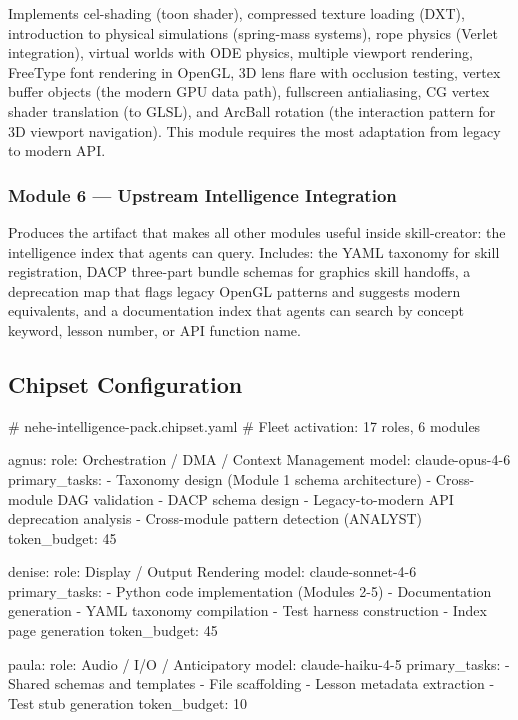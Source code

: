 \documentclass[11pt,letterpaper]{article}
\begin{document}
Implements cel-shading (toon shader), compressed texture loading (DXT), introduction to physical simulations (spring-mass systems), rope physics (Verlet integration), virtual worlds with ODE physics, multiple viewport rendering, FreeType font rendering in OpenGL, 3D lens flare with occlusion testing, vertex buffer objects (the modern GPU data path), fullscreen antialiasing, CG vertex shader translation (to GLSL), and ArcBall rotation (the interaction pattern for 3D viewport navigation). This module requires the most adaptation from legacy to modern API.

\subsubsection{Module 6 --- Upstream Intelligence Integration}

Produces the artifact that makes all other modules useful inside skill-creator: the intelligence index that agents can query. Includes: the YAML taxonomy for skill registration, DACP three-part bundle schemas for graphics skill handoffs, a deprecation map that flags legacy OpenGL patterns and suggests modern equivalents, and a documentation index that agents can search by concept keyword, lesson number, or API function name.

\subsection{Chipset Configuration}

\begin{asciibox}
# nehe-intelligence-pack.chipset.yaml
# Fleet activation: 17 roles, 6 modules

agnus:
  role: Orchestration / DMA / Context Management
  model: claude-opus-4-6
  primary_tasks:
    - Taxonomy design (Module 1 schema architecture)
    - Cross-module DAG validation
    - DACP schema design
    - Legacy-to-modern API deprecation analysis
    - Cross-module pattern detection (ANALYST)
  token_budget: 45%

denise:
  role: Display / Output Rendering
  model: claude-sonnet-4-6
  primary_tasks:
    - Python code implementation (Modules 2-5)
    - Documentation generation
    - YAML taxonomy compilation
    - Test harness construction
    - Index page generation
  token_budget: 45%

paula:
  role: Audio / I/O / Anticipatory
  model: claude-haiku-4-5
  primary_tasks:
    - Shared schemas and templates
    - File scaffolding
    - Lesson metadata extraction
    - Test stub generation
  token_budget: 10%
\end{asciibox}
\end{document}
